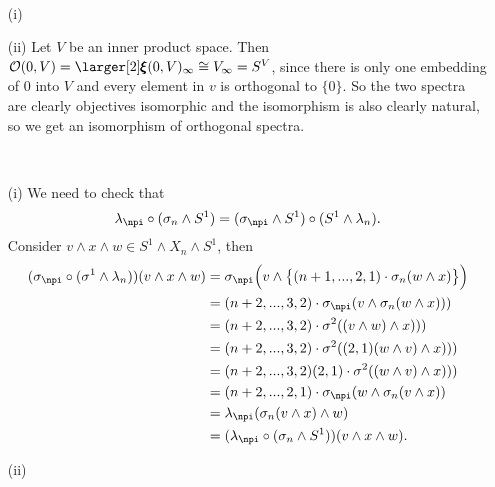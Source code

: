 
\def \L{\mathbb{L}}
\def \O{\mathcal{O}}

\renewcommand{\Xi}{{\mbox{\larger[2]$\pmb\xi$}}}


\mmaketitle

\begin{exercise}[1]\ 
\begin{enumerate}
\item[(i)]

\item[(ii)]
Let $V$ be an inner product space. Then $\O(0, V) = \Xi(0,V)_\infty \cong
V_\infty = S^V$,
since there is only one embedding of $0$ into $V$ and every element in $v$ is
orthogonal to $\{0\}$. So the two spectra are clearly objectives isomorphic and
the isomorphism is also clearly natural, so we get an isomorphism of orthogonal
spectra.
\end{enumerate}

\end{exercise}

\begin{exercise}[2]\ 
\begin{enumerate}
\item[(i)]
We need to check that 
\[ \lambda_\npi \circ (\sigma_n \wedge S^1) = (\sigma_\npi \wedge S^1) \circ
(S^1 \wedge \lambda_n). \]
Consider $v \wedge x \wedge w \in S^1 \wedge X_n \wedge S^1$, then
\begin{align*}
(\sigma_\npi \circ (\sigma^1 \wedge \lambda_n))(v \wedge x \wedge w) 
&= \sigma_\npi\Big(v \wedge \big\{ (n+1,...,2,1)\cdot\sigma_n(w \wedge x)\big\}\Big) \\
&= (n+2,...,3,2)\cdot\sigma_\npi(v \wedge \sigma_n(w\wedge x))) \\
&= (n+2,...,3,2) \cdot \sigma^2( (v \wedge w) \wedge x))) \\
&= (n+2,...,3,2) \cdot \sigma^2( (2,1) (w \wedge v) \wedge x))) \\
&= (n+2,...,3,2)(2,1) \cdot \sigma^2( (w \wedge v) \wedge x))) \\
&= (n+2,...,2,1) \cdot \sigma_\npi( w \wedge \sigma_n(v \wedge x)) \\
&= \lambda_\npi( \sigma_n(v \wedge x) \wedge w) \\
&= (\lambda_\npi \circ (\sigma_n \wedge S^1))(v \wedge x \wedge w).
\end{align*}

\item[(ii)]
\end{enumerate}
\end{exercise}

